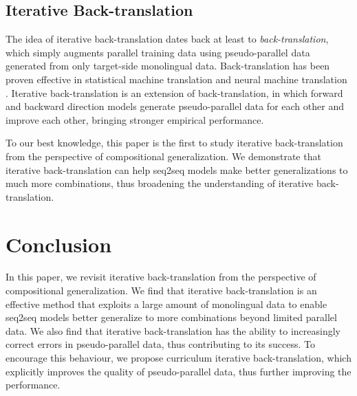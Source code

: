 \documentclass[letterpaper]{article} %
\begin{document}
\subsection{Iterative Back-translation}
The idea of iterative back-translation dates back at least to \emph{back-translation}, which simply augments parallel training data using pseudo-parallel data generated from only target-side monolingual data.
Back-translation has been proven effective in statistical machine translation \cite{goutte2009learning,bojar2011improving} and neural machine translation \cite{sennrich2016improving,edunov2018understanding,imamura2018enhancement,xia2019generalized,wang2019improving}.
Iterative back-translation \cite{hoang2018iterative,cotterell2018explaining,lample2018unsupervised,conneau2019cross} is an extension of back-translation, in which forward and backward direction models generate pseudo-parallel data for each other and improve each other, bringing stronger empirical performance.

To our best knowledge, this paper is the first to study iterative back-translation from the perspective of compositional generalization.
We demonstrate that iterative back-translation can help seq2seq models make better generalizations to much more combinations, thus broadening the understanding of iterative back-translation.

\section{Conclusion}
In this paper, we revisit iterative back-translation from the perspective of compositional generalization.
We find that iterative back-translation is an effective method that exploits a large amount of monolingual data to enable seq2seq models better generalize to more combinations beyond limited parallel data.
We also find that iterative back-translation has the ability to increasingly correct errors in pseudo-parallel data, thus contributing to its success.
To encourage this behaviour, we propose curriculum iterative back-translation, which explicitly improves the quality of pseudo-parallel data, thus further improving the performance. 




% 
\end{document}
